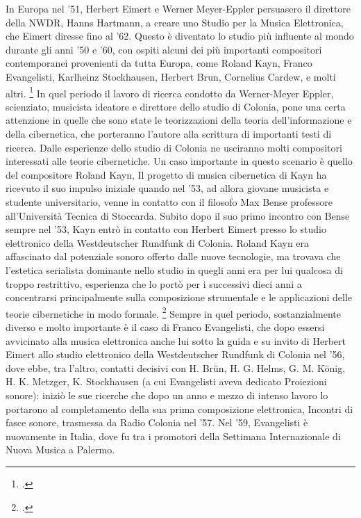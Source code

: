 In Europa nel '51, Herbert Eimert e Werner Meyer-Eppler
persuasero il direttore della NWDR,
Hanns Hartmann,
a creare uno Studio per la Musica Elettronica, che Eimert diresse fino al '62.
Questo è diventato lo studio più influente al mondo durante gli anni '50 e '60,
con ospiti alcuni dei più importanti compositori contemporanei provenienti da tutta Europa,
come Roland Kayn, Franco Evangelisti, Karlheinz Stockhausen, Herbert Brun,
Cornelius Cardew, e molti altri. \footcite{EMSColonia}
In quel periodo il lavoro di ricerca condotto da Werner-Meyer Eppler,
scienziato, musicista ideatore e direttore dello studio di Colonia,
pone una certa attenzione in quelle che sono state
le teorizzazioni della teoria dell'informazione e della cibernetica,
che porteranno l'autore alla scrittura di importanti testi di ricerca.
Dalle esperienze dello studio di Colonia ne usciranno molti compositori interessati
alle teorie cibernetiche.
Un caso importante in questo scenario è quello del compositore Roland Kayn,
Il progetto di musica cibernetica di Kayn ha ricevuto il suo impulso iniziale
quando nel '53, ad allora giovane musicista e studente universitario,
venne in contatto con il filosofo Max Bense professore all'Università Tecnica di Stoccarda.
Subito dopo il suo primo incontro con Bense sempre nel '53, Kayn entrò in contatto con Herbert
Eimert presso lo studio elettronico della Westdeutscher Rundfunk di Colonia.
Roland Kayn era affascinato dal potenziale sonoro offerto dalle nuove tecnologie,
ma trovava che l'estetica serialista dominante nello studio in quegli anni
era per lui qualcosa di troppo restrittivo, esperienza che lo portò
per i successivi dieci anni a concentrarsi
principalmente sulla composizione strumentale e le applicazioni delle teorie
cibernetiche in modo formale. \footcite{thomaswpattesonkayn}
Sempre in quel periodo, sostanzialmente diverso e molto importante
è il caso di Franco Evangelisti, che dopo essersi avvicinato alla musica elettronica
anche lui sotto la guida e su invito di Herbert Eimert allo studio elettronico
della Westdeutscher Rundfunk di Colonia nel '56, dove ebbe, tra l’altro,
contatti decisivi con H. Brün, H. G. Helms, G. M. König, H. K. Metzger,
K. Stockhausen (a cui Evangelisti aveva dedicato Proiezioni sonore):
iniziò le sue ricerche che dopo un anno e mezzo di intenso lavoro lo portarono
al completamento della sua prima composizione elettronica,
Incontri di fasce sonore, trasmessa da Radio Colonia nel '57.
Nel '59, Evangelisti è nuovamente in Italia, dove fu tra i promotori
della Settimana Internazionale di Nuova Musica a Palermo.
